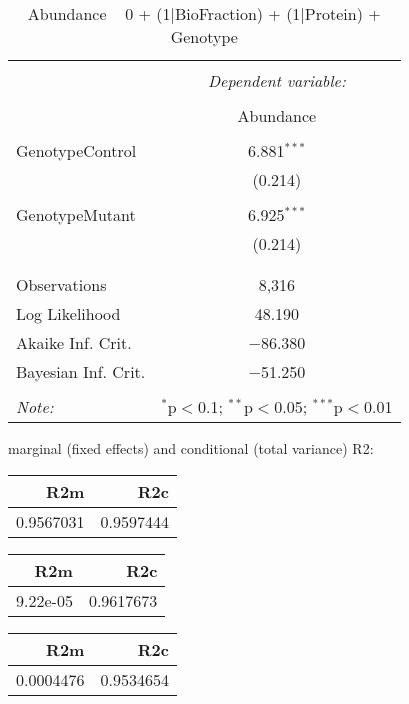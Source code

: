 \documentclass[11pt]{report}
\begin{document}
\begin{table}[!htbp] \centering 
  \caption{Abundance ~ 0 + (1|BioFraction) + (1|Protein) + Genotype} 
  \label{} 
\begin{tabular}{@{\extracolsep{5pt}}lc} 
\\[-1.8ex]\hline 
\hline \\[-1.8ex] 
 & \multicolumn{1}{c}{\textit{Dependent variable:}} \\ 
\cline{2-2} 
\\[-1.8ex] & Abundance \\ 
\hline \\[-1.8ex] 
 GenotypeControl & 6.881$^{***}$ \\ 
  & (0.214) \\ 
  & \\ 
 GenotypeMutant & 6.925$^{***}$ \\ 
  & (0.214) \\ 
  & \\ 
\hline \\[-1.8ex] 
Observations & 8,316 \\ 
Log Likelihood & 48.190 \\ 
Akaike Inf. Crit. & $-$86.380 \\ 
Bayesian Inf. Crit. & $-$51.250 \\ 
\hline 
\hline \\[-1.8ex] 
\textit{Note:}  & \multicolumn{1}{r}{$^{*}$p$<$0.1; $^{**}$p$<$0.05; $^{***}$p$<$0.01} \\ 
\end{tabular} 
\end{table} 
marginal (fixed effects) and conditional (total variance) R2:

\begin{tabular}{r|r}
\hline
R2m & R2c\\
\hline
0.9567031 & 0.9597444\\
\hline
\end{tabular}

\begin{tabular}{r|r}
\hline
R2m & R2c\\
\hline
9.22e-05 & 0.9617673\\
\hline
\end{tabular}

\begin{tabular}{r|r}
\hline
R2m & R2c\\
\hline
0.0004476 & 0.9534654\\
\hline
\end{tabular}
\end{document}
